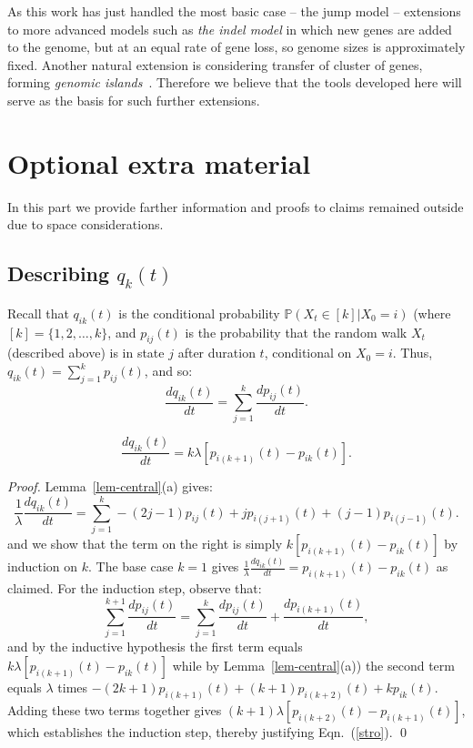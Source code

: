 \documentclass[runningheads, 11pt]{llncs}
\newcommand{\PP}{\mathbb{P}}
\begin{document}
As this work has just handled the most basic case -- the jump model --
extensions to more advanced models such as {\em the indel model} in which new
genes are added to the genome, but at an equal rate of gene loss, so genome
sizes is approximately fixed. Another natural extension is considering transfer
of cluster of genes, forming {\em genomic islands}~\cite{Koonin-JCB-2011}.
Therefore we believe that the tools developed here will serve as the basis for
such further extensions. 

\clearpage





\clearpage

\appendix
\section{ Optional extra material}
In this part we provide farther information and proofs to claims
remained outside due to space considerations.

\subsection{Describing $q_k(t)$}


\mbox{}


Recall that $q_{ik}(t)$ is the conditional probability $ \PP(X_t \in [k]|X_0=i)$
(where $[k]=\{1,2,\ldots, k\}$, and $p_{ij}(t)$ is the probability that the
random walk $X_t$ (described above) is in state $j$ after duration $t$,
conditional on $X_0= i$. Thus, $q_{ik}(t)= \sum_{j=1}^k p_{ij}(t)$, and so:
$$\frac{dq_{ik}(t)}{dt} = \sum_{j=1}^k \frac{dp_{ij}(t)}{dt}.$$

\begin{lemma}
\begin{equation}
\label{stro}
\frac{dq_{ik}(t)}{dt} = k \lambda [p_{i(k+1)}(t)-p_{ik}(t)].
\end{equation}
\end{lemma}
\begin{proof}
Lemma~\ref{lem-central}(a) gives: $$\frac{1}{\lambda}\frac{dq_{ik}(t)}{dt} =
\sum_{j=1}^k -(2j-1)p_{ij}(t) + jp_{i(j+1)}(t) +(j-1)p_{i(j-1)}(t).$$ and we
show that the term on the right is simply $k [p_{i(k+1)}(t)-p_{ik}(t)]$ by
induction on $k$. The base case $k=1$ gives
$\frac{1}{\lambda}\frac{dq_{ik}(t)}{dt} = p_{i(k+1)}(t)-p_{ik}(t)$ as claimed.
For the induction step, observe that: $$\sum_{j=1}^{k+1} \frac{dp_{ij}(t)}{dt}
=\sum_{j=1}^k \frac{dp_{ij}(t)}{dt} +\frac{dp_{i(k+1)}(t)}{dt},$$ and by the
inductive hypothesis the first term equals $k \lambda [p_{i(k+1)}(t)-p_{ik}(t)]$
while by Lemma~\ref{lem-central}(a)) the second term equals $\lambda$ times
$-(2k+1)p_{i(k+1)}(t) + (k+1)p_{i(k+2)}(t) + kp_{ik}(t)$. Adding these two terms
together gives $(k+1) \lambda [p_{i(k+2)}(t)-p_{i(k+1)}(t)]$, which establishes
the induction step, thereby justifying Eqn.~(\ref{stro}). \qed
\end{proof}
\end{document}
